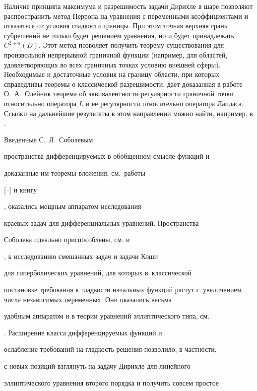 Наличие принципа максимума и разрешимость задачи Дирихле в шаре позволяют распространить метод Перрона на уравнения с переменными коэффициентами и отказаться от условия гладкости границы. При этом точная верхняя грань субрешений не только будет решением уравнения, но и будет принадлежать $C^{2+\alpha}(D)$. Этот метод позволяет получить теорему существования для произвольной непрерывной граничной функции (например, для областей, удовлетворяющих во всех граничных точках условию внешней сферы). Необходимые и достаточные условия на границу области, при которых справедливы теоремы о классической разрешимости, дает доказанная в работе О.~А.~Олейник \cite{gushin:Ol1} теорема об эквивалентности регулярности граничной точки относительно оператора $L$ и ее регулярности относительно оператора Лапласа. Ссылки на дальнейшие результаты в этом направлении можно найти, например, в  \cite{gushin:GTr}.



\smallskip



 Введенные С.~Л.~Соболевым

пространства дифференцируемых в обобщенном смысле функций и

доказанные им теоремы вложения, см.~работы

[--]  и книгу

\cite{gushin:Sob3}, оказались мощным аппаратом исследования

краевых задач для дифференциальных уравнений. Пространства

Соболева идеально приспособлены, см. \cite{gushin:Sob4} и

\cite{gushin:Sob3}, к исследованию смешанных задач и задачи Коши

для гиперболических уравнений, для которых в~классической

постановке требования к гладкости начальных функций растут с~увеличением числа независимых переменных. Они оказались весьма

удобным аппаратом и в теории уравнений эллиптического типа, см.

\cite{gushin:Sob3}. Расширение класса дифференцируемых функций и

ослабление требований на гладкость решения позволило, в частности,

с новых позиций взглянуть на задачу Дирихле для линейного

эллиптического уравнения второго порядка и получить совсем простое

